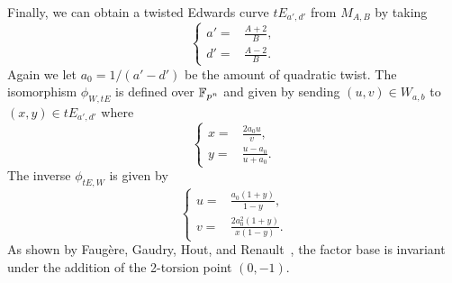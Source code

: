 Finally, we can obtain a twisted Edwards curve $tE_{a',d'}$ from
$M_{A,B}$ by taking
\[ \left\{\begin{aligned}
a' = & \frac{A + 2}{B}, \\
d' = & \frac{A - 2}{B}.
\end{aligned}\right. \]
%
Again we let $a_0=1/(a' - d')$ be the amount of quadratic twist.
%
The isomorphism $\phi_{W,tE}$ is defined over $\mathbb F_{p^n}$ and given by
sending $(u,v)\in W_{a,b}$ to $(x,y)\in tE_{a',d'}$ where
\[ \left\{\begin{aligned}
x = & \frac{2a_0u}{v}, \\
y = & \frac{u - a_0}{u + a_0}.
\end{aligned}\right. \]
%
The inverse $\phi_{tE,W}$ is given by
\[ \left\{\begin{aligned}
u = & \frac{a_0(1 + y)}{1 - y}, \\
v = & \frac{2a_0^2(1 + y)}{x(1 - y)}.
\end{aligned}\right. \]
%
As shown by Faug\`ere, Gaudry, Hout, and
Renault~\cite{DBLP:conf/eurocrypt/FaugereHJRV14}, the factor base is
invariant under the addition of the 2-torsion point $(0,-1)$.

